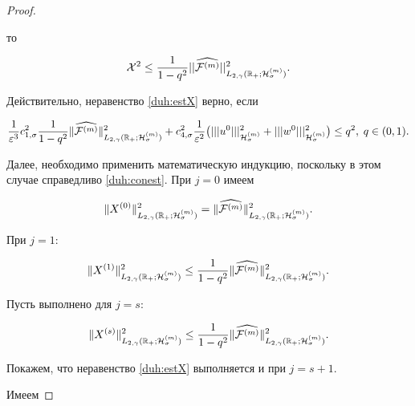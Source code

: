 \begin{proof}
\begin{equation}
\end{equation}

то

\begin{equation}

{\cal X}^2\le \frac{1}{1-q^2}|| \widehat{{\cal F}^{(m)}} ||^2_{L_{2,\gamma}(\mathbb R_{+};{\cal H}^{(m)}_{\sigma})}.

\label{duh:estX}

\end{equation}

Действительно, неравенство \eqref{duh:estX} верно, если

$$

\frac{1}{\varepsilon^3}c^2_{1,\sigma}\frac{1}{1-q^2}

\| \widehat{{\cal F}^{(m)}} \|^2_{L_{2,\gamma}(\mathbb R_{+};{\cal H}^{(m)}_{\sigma})}

+c^2_{4,\sigma}\frac{1}{\varepsilon^2}

\bigl(|||u^0|||^2_{{\cal H}^{(m)}_\sigma}+|||w^0|||^2_{{\cal H}^{(m)}_\sigma}\bigr)\le q^2 , \; q\in (0,1).

$$

Далее, необходимо применить математическую индукцию, поскольку в этом случае справедливо \eqref{duh:conest}. При $j=0$ имеем

$$

\|X^{(0)}\|^2_{L_{2,\gamma}(\mathbb R_{+};{\cal H}^{(m)}_{\sigma})} = 

\|\widehat{{\cal F}^{(m)}} \|^2_{L_{2,\gamma}(\mathbb R_{+};{\cal H}^{(m)}_{\sigma})}.

$$

При  $j=1$: 

$$

\|X^{(1)}\|^2_{L_{2,\gamma}(\mathbb R_{+};{\cal H}^{(m)}_{\sigma})} \le \frac{1}{1-q^2}

\| \widehat{{\cal F}^{(m)}} \|^2_{L_{2,\gamma}(\mathbb R_{+};{\cal H}^{(m)}_{\sigma})}.

$$

Пусть выполнено для $j=s$:

 $$

\|X^{(s)}\|^2_{L_{2,\gamma}(\mathbb R_{+};{\cal H}^{(m)}_{\sigma})} \le \frac{1}{1-q^2}\| \widehat{{\cal F}^{(m)}} \|^2_{L_{2,\gamma}(\mathbb R_{+};{\cal H}^{(m)}_{\sigma})}.

$$

Покажем, что неравенство \eqref{duh:estX} выполняется и при $j=s+1$. 

Имеем


\end{proof}
